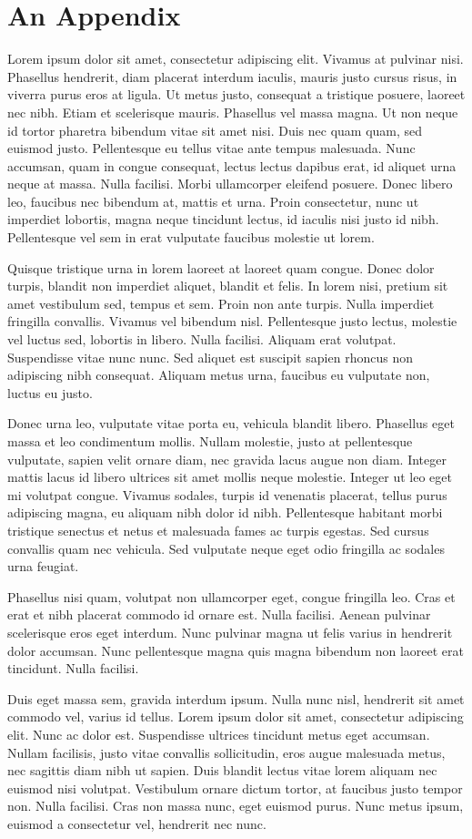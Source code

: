 \chapter{An Appendix}

Lorem ipsum dolor sit amet, consectetur adipiscing elit. Vivamus at pulvinar
nisi. Phasellus hendrerit, diam placerat interdum iaculis, mauris justo cursus
risus, in viverra purus eros at ligula. Ut metus justo, consequat a tristique
posuere, laoreet nec nibh. Etiam et scelerisque mauris. Phasellus vel massa
magna. Ut non neque id tortor pharetra bibendum vitae sit amet nisi. Duis nec
quam quam, sed euismod justo. Pellentesque eu tellus vitae ante tempus
malesuada. Nunc accumsan, quam in congue consequat, lectus lectus dapibus erat,
id aliquet urna neque at massa. Nulla facilisi. Morbi ullamcorper eleifend
posuere. Donec libero leo, faucibus nec bibendum at, mattis et urna. Proin
consectetur, nunc ut imperdiet lobortis, magna neque tincidunt lectus, id
iaculis nisi justo id nibh. Pellentesque vel sem in erat vulputate faucibus
molestie ut lorem.

Quisque tristique urna in lorem laoreet at laoreet quam congue. Donec dolor
turpis, blandit non imperdiet aliquet, blandit et felis. In lorem nisi, pretium
sit amet vestibulum sed, tempus et sem. Proin non ante turpis. Nulla imperdiet
fringilla convallis. Vivamus vel bibendum nisl. Pellentesque justo lectus,
molestie vel luctus sed, lobortis in libero. Nulla facilisi. Aliquam erat
volutpat. Suspendisse vitae nunc nunc. Sed aliquet est suscipit sapien rhoncus
non adipiscing nibh consequat. Aliquam metus urna, faucibus eu vulputate non,
luctus eu justo.

Donec urna leo, vulputate vitae porta eu, vehicula blandit libero. Phasellus
eget massa et leo condimentum mollis. Nullam molestie, justo at pellentesque
vulputate, sapien velit ornare diam, nec gravida lacus augue non diam. Integer
mattis lacus id libero ultrices sit amet mollis neque molestie. Integer ut leo
eget mi volutpat congue. Vivamus sodales, turpis id venenatis placerat, tellus
purus adipiscing magna, eu aliquam nibh dolor id nibh. Pellentesque habitant
morbi tristique senectus et netus et malesuada fames ac turpis egestas. Sed
cursus convallis quam nec vehicula. Sed vulputate neque eget odio fringilla ac
sodales urna feugiat.

Phasellus nisi quam, volutpat non ullamcorper eget, congue fringilla leo. Cras
et erat et nibh placerat commodo id ornare est. Nulla facilisi. Aenean pulvinar
scelerisque eros eget interdum. Nunc pulvinar magna ut felis varius in
hendrerit dolor accumsan. Nunc pellentesque magna quis magna bibendum non
laoreet erat tincidunt. Nulla facilisi.

Duis eget massa sem, gravida interdum ipsum. Nulla nunc nisl, hendrerit sit
amet commodo vel, varius id tellus. Lorem ipsum dolor sit amet, consectetur
adipiscing elit. Nunc ac dolor est. Suspendisse ultrices tincidunt metus eget
accumsan. Nullam facilisis, justo vitae convallis sollicitudin, eros augue
malesuada metus, nec sagittis diam nibh ut sapien. Duis blandit lectus vitae
lorem aliquam nec euismod nisi volutpat. Vestibulum ornare dictum tortor, at
faucibus justo tempor non. Nulla facilisi. Cras non massa nunc, eget euismod
purus. Nunc metus ipsum, euismod a consectetur vel, hendrerit nec nunc.
